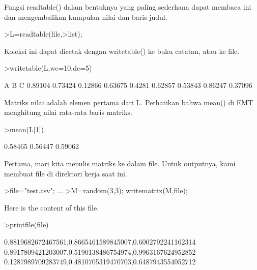 \documentclass[a4paper,10pt]{article}
\begin{document}
\begin{eulernotebook}
\begin{eulercomment}
\begin{eulercomment}
\begin{eulercomment}
\begin{eulercomment}
\begin{eulercomment}
\begin{eulercomment}
\begin{eulercomment}
\begin{eulercomment}
\begin{eulercomment}
\begin{eulercomment}
\begin{eulercomment}
\begin{eulercomment}
\begin{eulercomment}
\begin{eulercomment}
\begin{euleroutput}
\end{euleroutput}
\begin{eulercomment}
Fungsi readtable() dalam bentuknya yang paling sederhana dapat membaca
ini dan mengembalikan kumpulan nilai dan baris judul.
\end{eulercomment}
\begin{eulerprompt}
>L=readtable(file,>list);
\end{eulerprompt}
\begin{eulercomment}
Koleksi ini dapat dicetak dengan writetable() ke buku catatan, atau ke
file.
\end{eulercomment}
\begin{eulerprompt}
>writetable(L,wc=10,dc=5)
\end{eulerprompt}
\begin{euleroutput}
           A         B         C
     0.89104   0.73424   0.12866
     0.63675    0.4281   0.62857
     0.53843   0.86247   0.37096
\end{euleroutput}
\begin{eulercomment}
Matriks nilai adalah elemen pertama dari L. Perhatikan bahwa mean() di
EMT menghitung nilai rata-rata baris matriks.
\end{eulercomment}
\begin{eulerprompt}
>mean(L[1])
\end{eulerprompt}
\begin{euleroutput}
    0.58465 
    0.56447 
    0.59062 
\end{euleroutput}
\begin{eulercomment}
Pertama, mari kita menulis matriks ke dalam file. Untuk outputnya,
kami membuat file di direktori kerja saat ini.
\end{eulercomment}
\begin{eulerprompt}
>file="test.csv";  ...
>M=random(3,3); writematrix(M,file);
\end{eulerprompt}
\begin{eulercomment}
Here is the content of this file.
\end{eulercomment}
\begin{eulerprompt}
>printfile(file)
\end{eulerprompt}
\begin{euleroutput}
  0.8819682672467561,0.8665461589845007,0.6002792241162314
  0.8917809421203007,0.5190138486754974,0.9963167624952852
  0.1287989709283749,0.4810705319470703,0.6487943554052712
  

\end{euleroutput}
\end{eulercomment}
\end{eulercomment}
\end{eulercomment}
\end{eulercomment}
\end{eulercomment}
\end{eulercomment}
\end{eulercomment}
\end{eulercomment}
\end{eulercomment}
\end{eulercomment}
\end{eulercomment}
\end{eulercomment}
\end{eulercomment}
\end{eulercomment}
\end{eulernotebook}
\end{document}
